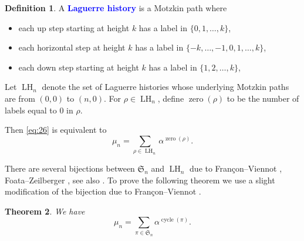 \documentclass[oneside]{book}
\numberwithin{equation}{section}
\newtheorem{thm}{Theorem}[section]
\theoremstyle{definition}
\newtheorem{defn}[thm]{Definition}
\newcommand\zero{\operatorname{zero}}
\newcommand\LH{\operatorname{LH}}
\newcommand\cycle{\operatorname{cycle}}
\newcommand\sym{\mathfrak{S}}
\renewcommand\emph[1]{\textcolor{blue}{\bf #1}}
\begin{document}
\begin{defn}
  A \emph{Laguerre history} is a Motzkin path where 
\begin{itemize}
\item each up step starting at height \( k \)
  has a label in \( \{0,1,\dots,k\} \),
\item each horizontal step at height \( k \) has a label in
  \( \{-k,\dots,-1,0,1,\dots,k\} \),
\item  each down step starting at height \( k \)
  has a label in \( \{1,2,\dots,k\} \),
\end{itemize}

Let \( \LH_{n} \) denote the set of Laguerre histories whose
underlying Motzkin paths are from \( (0,0) \) to \( (n,0) \). For
\( \rho\in \LH_{n} \), define \( \zero(\rho) \) to be the
number of labels equal to \( 0 \) in \( \rho \).
\end{defn}

Then \eqref{eq:26} is equivalent to
\[
  \mu_n = \sum_{\rho\in \LH_n} \alpha^{\zero(\rho)}.
\]

There are several bijections between \( \sym_n \) and \( \LH_n \) due
to Fran\c{c}on--Viennot \cite{Francon1979}, Foata--Zeilberger
\cite{Foata1990a}, see also \cite[Algorithm~7]{Corteel2020a}. To prove
the following theorem we use a slight modification of the bijection
due to Fran\c{c}on--Viennot \cite{Francon1979}.

\begin{thm}\label{thm:Lag-mom}
We have
\[
  \mu_n = \sum_{\pi\in \sym_n} \alpha^{\cycle(\pi)}.
\]
\end{thm}
\end{document}
